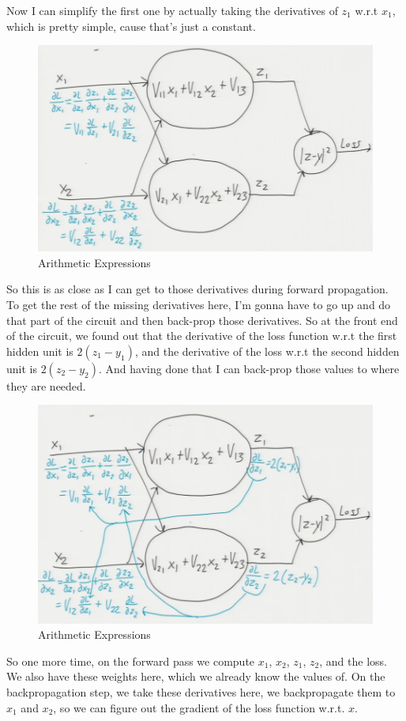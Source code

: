 \documentclass[fleqn,10pt]{olplainarticle}
\theoremstyle{definition}
\theoremstyle{remark}
\begin{document}
Now I can simplify the first one by actually taking the derivatives of $z_1$ w.r.t $x_1$, which is pretty simple, cause that's just a constant.
\begin{figure}[ht]
\centering
\includegraphics[width=0.7\linewidth]{images/arithmetic_expression_14}
\caption{Arithmetic Expressions}
\label{fig:arithmetic_expression_14}
\end{figure}

So this is as close as I can get to those derivatives during forward propagation. To get the rest of the missing derivatives here, I'm gonna have to go up and do that part of the circuit and then back-prop those derivatives. So at the front end of the circuit, we found out that the derivative of the loss function w.r.t the first hidden unit is $2(z_1 - y_1)$, and the derivative of the loss w.r.t the second hidden unit is $2(z_2 - y_2)$. And having done that I can back-prop those values to where they are needed.
\begin{figure}[ht]
\centering
\includegraphics[width=0.7\linewidth]{images/arithmetic_expression_15}
\caption{Arithmetic Expressions}
\label{fig:arithmetic_expression_15}
\end{figure}

So one more time, on the forward pass we compute $x_1$, $x_2$, $z_1$, $z_2$, and the loss. We also have these weights here, which we already know the values of. On the backpropagation step, we take these derivatives here, we backpropagate them to $x_1$ and $x_2$, so we can figure out the gradient of the loss function w.r.t. $x$.
\clearpage
\end{document}

